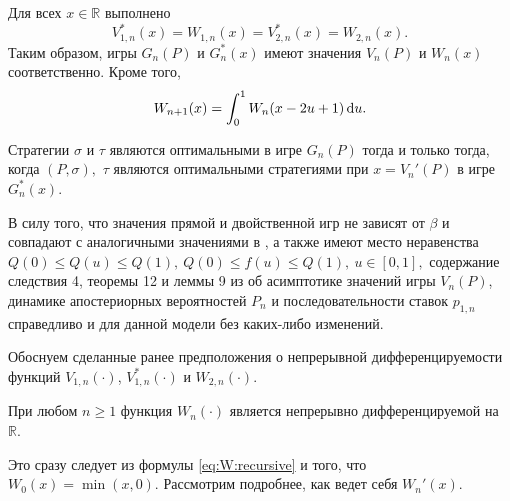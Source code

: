 {\begin{theorem}\label{theorem:dual:relations}
  Для всех $x \in \mathbb{R}$ выполнено
  \begin{equation}\label{eq:duality:relationships}
    V_{1,n}^*(x) = W_{1,n}(x) = V_{2,n}^*(x) = W_{2,n}(x).
  \end{equation}
  Таким образом, игры $G_n(P)$ и $G_n^*(x)$ имеют значения $V_n(P)$ и $W_n(x)$ соответственно.
  Кроме того,
  \begin{equation}\label{eq:W:recursive}
    W_{n+1}(x) = \int_0^1 W_n(x - 2u + 1) \mathop{}\!\mathrm{d} u.
  \end{equation}
\end{theorem}

\begin{theorem}\label{theorem:optimal-strategies}
  Стратегии $\sigma$ и $\tau$ являются оптимальными в игре $G_n(P)$ тогда и
  только тогда, когда $(P, \sigma),$ $\tau$ являются оптимальными стратегиями
  при $x = V_n'(P)$ в игре $G_n^*(x)$.
\end{theorem}

В силу того, что значения прямой и двойственной игр не зависят от $\beta$ и
совпадают с аналогичными значениями в \cite{demeyer02}, а также имеют место
неравенства %
$ Q(0) \leqslant Q(u) \leqslant Q(1),\ Q(0) \leqslant f(u) \leqslant Q(1),\ u
\in [0, 1], $ %
содержание следствия 4, теоремы 12 и леммы 9 из \cite{demeyer02} об
асимптотике значений игры $V_n(P)$, динамике апостериорных вероятностей $P_n$ и
последовательности ставок $p_{1,n}$ справедливо и для данной модели без
каких-либо изменений.

Обоснуем сделанные ранее предположения о непрерывной дифференцируемости функций $V_{1,n}(\cdot)$, $V_{1,n}^*(\cdot)$ и $W_{2,n}(\cdot)$.

\begin{proposition}
  При любом $n \geqslant 1$ функция $W_n(\cdot)$ является непрерывно дифференцируемой на $\mathbb{R}$.
\end{proposition}
Это сразу следует из формулы \eqref{eq:W:recursive} и того, что $W_0(x) = \min(x, 0)$.
Рассмотрим подробнее, как ведет себя $W_n'(x)$.

}
